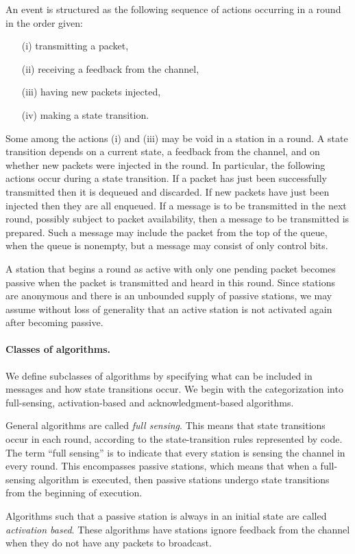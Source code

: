 \documentclass[11pt]{article}
\newcommand{\BBB}{\vspace*{-\bigskipamount}}
\newcommand{\Paragraph}[1]{\BBB\paragraph{#1}}
\begin{document}
An event is structured as the following sequence of actions occurring in a round in the order given:
\begin{enumerate}
\item[(i)] 
transmitting a packet,
\item[(ii)] 
receiving a feedback from the channel, 
\item[(iii)]  
having new packets injected,
\item[(iv)] 
making a state transition.
\end{enumerate}
Some among the actions (i) and (iii) may be void in a station in a round.
A state transition depends on a current state, a feedback from the channel, and on whether new packets were injected in the round.
In particular, the following actions occur during a state transition.
If a packet has just been successfully transmitted then it is dequeued and discarded.
If new packets have just been injected then they are all enqueued.
If a message is to be transmitted in the next round, possibly subject to packet availability,  then a message to be transmitted is prepared.
Such a message may include the packet from the top of the queue, when the queue is nonempty, but a message may consist of only control bits.

A station that begins a round as active with only one pending packet becomes passive when the packet is transmitted and heard in this round.
Since stations are anonymous and there is an unbounded supply of passive stations, we may assume without loss of generality that an active station is not activated again after becoming passive.




\Paragraph{Classes of algorithms.}




We define subclasses of algorithms by specifying what can be included in messages and how state transitions occur. 
We begin with the categorization into full-sensing, activation-based and acknowledgment-based algorithms.

General algorithms are called \emph{full sensing}.
This means that state transitions occur in each round, according to the state-transition rules represented by code.
The term ``full sensing'' is to indicate that every station is sensing the channel in every round. 
This encompasses passive stations, which means that when a full-sensing algorithm is executed, then passive stations undergo state transitions from the beginning of execution.

Algorithms such that a passive station is always in an initial state are called \emph{activation based}.
These algorithms have stations ignore feedback from the channel when they do not have any  packets to broadcast.
\end{document}
